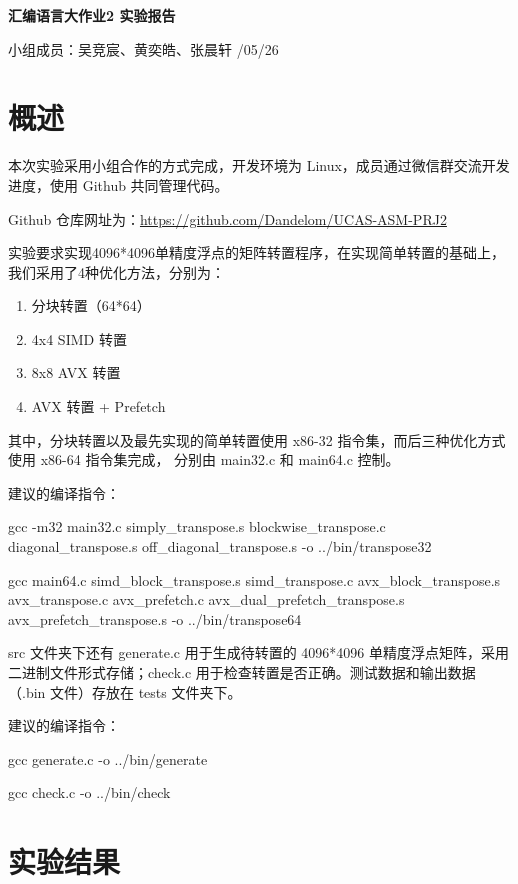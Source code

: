 \documentclass[11pt]{article}
\begin{document}
\begin{center}
    {\LARGE \bf 汇编语言大作业2 \quad 实验报告} \\
\end{center}
\begin{kaishu}
    小组成员：吴竞宸、黄奕皓、张晨轩 \hfill {}/05/26
\end{kaishu}

\section{概述}
本次实验采用小组合作的方式完成，开发环境为 Linux，成员通过微信群交流开发进度，使用 Github 共同管理代码。

Github 仓库网址为：\url{https://github.com/Dandelom/UCAS-ASM-PRJ2}

实验要求实现4096*4096单精度浮点的矩阵转置程序，在实现简单转置的基础上，我们采用了4种优化方法，分别为：
\begin{enumerate}
    \item 分块转置（64*64）
    \item 4x4 SIMD 转置
    \item 8x8 AVX 转置
    \item AVX 转置 + Prefetch
\end{enumerate}

其中，分块转置以及最先实现的简单转置使用 x86-32 指令集，而后三种优化方式使用 x86-64 指令集完成，
分别由 main32.c 和 main64.c 控制。

建议的编译指令：

gcc -m32 main32.c simply\_transpose.s blockwise\_transpose.c diagonal\_transpose.s off\_diagonal\_\allowbreak transpose.s -o ../bin/transpose32

gcc main64.c simd\_block\_transpose.s simd\_transpose.c avx\_block\_transpose.s avx\_transpose.c avx\_prefetch.c avx\_dual\_prefetch\_transpose.s avx\_prefetch\_transpose.s -o ../bin/transpose64

src 文件夹下还有 generate.c 用于生成待转置的 4096*4096 单精度浮点矩阵，采用二进制文件形式存储；check.c 用于检查转置是否正确。测试数据和输出数据（.bin 文件）存放在 tests 文件夹下。

建议的编译指令：

gcc generate.c -o ../bin/generate

gcc check.c -o ../bin/check

\section{实验结果}
\end{document}
